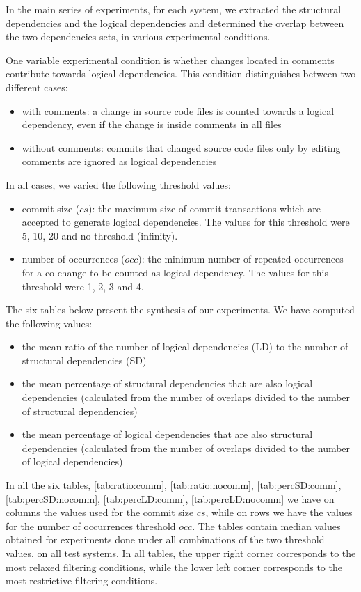 \documentclass[12pt]{mitthesis}
\begin{document}
In the main series of experiments, for each system, we extracted the structural dependencies and the logical dependencies and determined the overlap between the two dependencies sets, in various experimental conditions. 

One variable experimental condition is whether changes located in comments contribute towards logical dependencies. This condition distinguishes between two different cases: 
\begin{itemize}
	\item with comments: a change in source code files is counted towards a logical dependency, even if the change is inside comments in all files
	\item without comments: commits that changed source code files only by editing comments are ignored as logical dependencies
\end{itemize}

In all cases, we varied the following threshold values: 
 \begin{itemize}
	\item commit size ($cs$): the maximum size of commit transactions which are accepted to generate logical dependencies. The values for this threshold were 5, 10, 20 and no threshold (infinity).  
	\item number of occurrences ($occ$): the minimum number of repeated occurrences for a co-change to be counted as logical dependency. The values for this threshold were 1, 2, 3 and 4.  
\end{itemize}

The six tables below present the synthesis of our experiments. 
We have computed the following  values:
\begin{itemize}
	\item the mean ratio of the number of logical dependencies  (LD) to the number of structural dependencies (SD)
   \item the mean percentage of structural dependencies that are also logical dependencies (calculated from the number of overlaps divided to the number of structural dependencies)	
		\item the mean percentage of logical dependencies that are also structural dependencies (calculated from the number of overlaps divided to the number of logical dependencies)
\end{itemize}

In all the six tables, \ref{tab:ratio:comm}, \ref{tab:ratio:nocomm}, \ref{tab:percSD:comm}, \ref{tab:percSD:nocomm},
\ref{tab:percLD:comm}, \ref{tab:percLD:nocomm} we have on columns the values used for the commit size $cs$, while on rows we have the values for the number of occurrences threshold $occ$. The tables contain median values obtained for experiments done under all combinations of the two threshold values, on all test systems. In all tables, the upper right corner corresponds to the most relaxed filtering conditions, while the lower left corner corresponds to the most restrictive filtering conditions.
\end{document}
